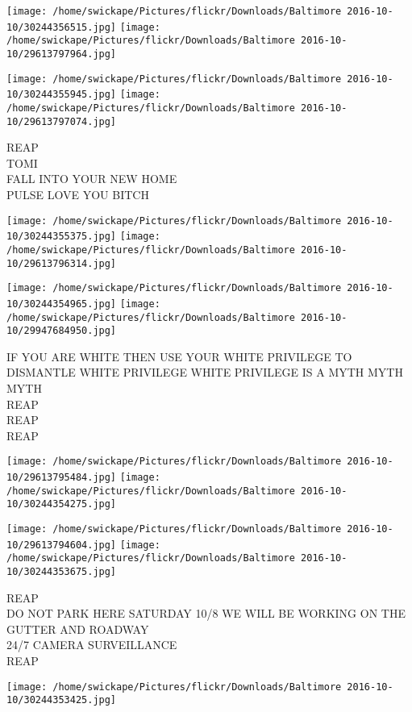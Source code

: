 \documentclass[10pt,letterpaper]{article}
\begin{document}
\texttt{[image: /home/swickape/Pictures/flickr/Downloads/Baltimore 2016-10-10/30244356515.jpg]}
\texttt{[image: /home/swickape/Pictures/flickr/Downloads/Baltimore 2016-10-10/29613797964.jpg]}

\texttt{[image: /home/swickape/Pictures/flickr/Downloads/Baltimore 2016-10-10/30244355945.jpg]}
\texttt{[image: /home/swickape/Pictures/flickr/Downloads/Baltimore 2016-10-10/29613797074.jpg]}

REAP\\
TOMI\\
FALL INTO YOUR NEW HOME\\
PULSE LOVE YOU BITCH\\
\pagebreak

\texttt{[image: /home/swickape/Pictures/flickr/Downloads/Baltimore 2016-10-10/30244355375.jpg]}
\texttt{[image: /home/swickape/Pictures/flickr/Downloads/Baltimore 2016-10-10/29613796314.jpg]}

\texttt{[image: /home/swickape/Pictures/flickr/Downloads/Baltimore 2016-10-10/30244354965.jpg]}
\texttt{[image: /home/swickape/Pictures/flickr/Downloads/Baltimore 2016-10-10/29947684950.jpg]}

IF YOU ARE WHITE THEN USE YOUR WHITE PRIVILEGE TO DISMANTLE WHITE PRIVILEGE WHITE PRIVILEGE IS A MYTH MYTH MYTH\\
REAP\\
REAP\\
REAP\\
\pagebreak

\texttt{[image: /home/swickape/Pictures/flickr/Downloads/Baltimore 2016-10-10/29613795484.jpg]}
\texttt{[image: /home/swickape/Pictures/flickr/Downloads/Baltimore 2016-10-10/30244354275.jpg]}

\texttt{[image: /home/swickape/Pictures/flickr/Downloads/Baltimore 2016-10-10/29613794604.jpg]}
\texttt{[image: /home/swickape/Pictures/flickr/Downloads/Baltimore 2016-10-10/30244353675.jpg]}

REAP\\
DO NOT PARK HERE SATURDAY 10/8 WE WILL BE WORKING ON THE GUTTER AND ROADWAY\\
24/7 CAMERA SURVEILLANCE\\
REAP\\
\pagebreak

\texttt{[image: /home/swickape/Pictures/flickr/Downloads/Baltimore 2016-10-10/30244353425.jpg]}
\end{document}
